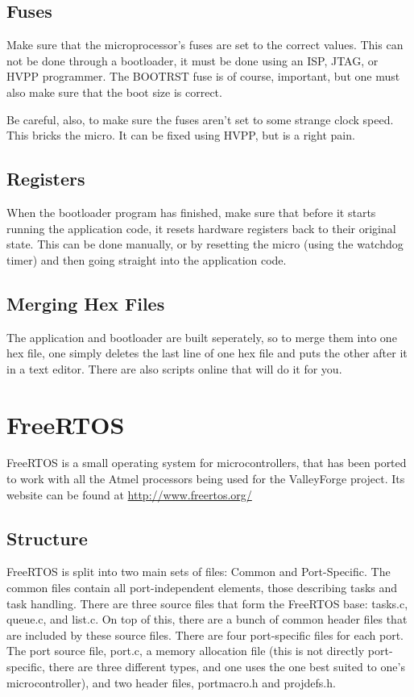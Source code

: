 \documentclass[a4paper, oneside, 11pt, titlepage, onecolumn, openright]{report}
\begin{document}
{{\section{Fuses}
			\label{s:BootloaderFuses}
			Make sure that the microprocessor's fuses are set to the correct values. This can not be done through a bootloader, it must be done using an ISP, JTAG, or HVPP programmer. The BOOTRST fuse is of course, important, but one must also make sure that the boot size is correct.
			
			Be careful, also, to make sure the fuses aren't set to some strange clock speed. This bricks the micro. It can be fixed using HVPP, but is a right pain.
						
\section{Registers}
			\label{s:BootloaderRegisters}
			When the bootloader program has finished, make sure that before it starts running the application code, it resets hardware registers back to their original state. This can be done manually, or by resetting the micro (using the watchdog timer) and then going straight into the application code.
			
			
\section{Merging Hex Files}
			\label{s:BootloaderMergingHexFiles}
			The application and bootloader are built seperately, so to merge them into one hex file, one simply deletes the last line of one hex file and puts the other after it in a text editor.
			There are also scripts online that will do it for you.
			
\chapter{FreeRTOS}
			\label{C:FreeRTOS}
			FreeRTOS is a small operating system for microcontrollers, that has been ported to work with all the Atmel processors being used for the ValleyForge project. Its website can be found at \url{http://www.freertos.org/}
			
\section{Structure}
			\label{s:FreeRTOSStructure}
			FreeRTOS is split into two main sets of files: Common and Port-Specific. The common files contain all port-independent elements, those describing tasks and task handling.\newline
			There are three source files that form the FreeRTOS base: tasks.c, queue.c, and list.c. On top of this, there are a bunch of common header files that are included by these source files.\newline
			There are four port-specific files for each port. The port source file, port.c, a memory allocation file (this is not directly port-specific, there are three different types, and one uses the one best suited to one's microcontroller), and two header files, portmacro.h and projdefs.h. 			
						
}}
\end{document}
